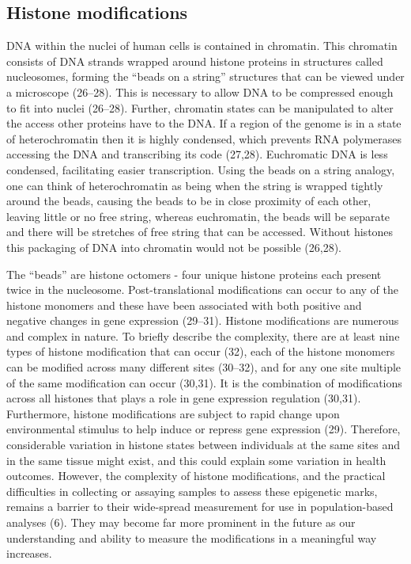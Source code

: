 \documentclass[11pt,twoside]{bristolthesis}
\begin{document}
\hypertarget{histone-modifications}{%
\subsection{Histone modifications}\label{histone-modifications}}

DNA within the nuclei of human cells is contained in chromatin. This chromatin consists of DNA strands wrapped around histone proteins in structures called nucleosomes, forming the ``beads on a string'' structures that can be viewed under a microscope (26--28). This is necessary to allow DNA to be compressed enough to fit into nuclei (26--28). Further, chromatin states can be manipulated to alter the access other proteins have to the DNA. If a region of the genome is in a state of heterochromatin then it is highly condensed, which prevents RNA polymerases accessing the DNA and transcribing its code (27,28). Euchromatic DNA is less condensed, facilitating easier transcription. Using the beads on a string analogy, one can think of heterochromatin as being when the string is wrapped tightly around the beads, causing the beads to be in close proximity of each other, leaving little or no free string, whereas euchromatin, the beads will be separate and there will be stretches of free string that can be accessed. Without histones this packaging of DNA into chromatin would not be possible (26,28).

The ``beads'' are histone octomers - four unique histone proteins each present twice in the nucleosome. Post-translational modifications can occur to any of the histone monomers and these have been associated with both positive and negative changes in gene expression (29--31). Histone modifications are numerous and complex in nature. To briefly describe the complexity, there are at least nine types of histone modification that can occur (32), each of the histone monomers can be modified across many different sites (30--32), and for any one site multiple of the same modification can occur (30,31). It is the combination of modifications across all histones that plays a role in gene expression regulation (30,31). Furthermore, histone modifications are subject to rapid change upon environmental stimulus to help induce or repress gene expression (29). Therefore, considerable variation in histone states between individuals at the same sites and in the same tissue might exist, and this could explain some variation in health outcomes. However, the complexity of histone modifications, and the practical difficulties in collecting or assaying samples to assess these epigenetic marks, remains a barrier to their wide-spread measurement for use in population-based analyses (6). They may become far more prominent in the future as our understanding and ability to measure the modifications in a meaningful way increases.
\end{document}
